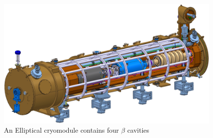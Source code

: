 \begin{figure}[!ht]
	\begin{center}
		\includegraphics[width=\textwidth]{02_BeamDiag/figures/fig000_cryo_a}
	\end{center}
	\caption[]{An Elliptical cryomodule contains four $\beta$ cavities}
	\label{chap:}
\end{figure}
